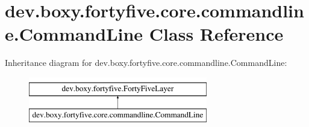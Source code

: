 \hypertarget{classdev_1_1boxy_1_1fortyfive_1_1core_1_1commandline_1_1_command_line}{
\section{dev.boxy.fortyfive.core.commandline.CommandLine Class Reference}
\label{d6/dfd/classdev_1_1boxy_1_1fortyfive_1_1core_1_1commandline_1_1_command_line}
}
Inheritance diagram for dev.boxy.fortyfive.core.commandline.CommandLine:\begin{figure}[H]
\begin{center}
\leavevmode
\includegraphics[height=2.000000cm]{d6/dfd/classdev_1_1boxy_1_1fortyfive_1_1core_1_1commandline_1_1_command_line}
\end{center}
\end{figure}
